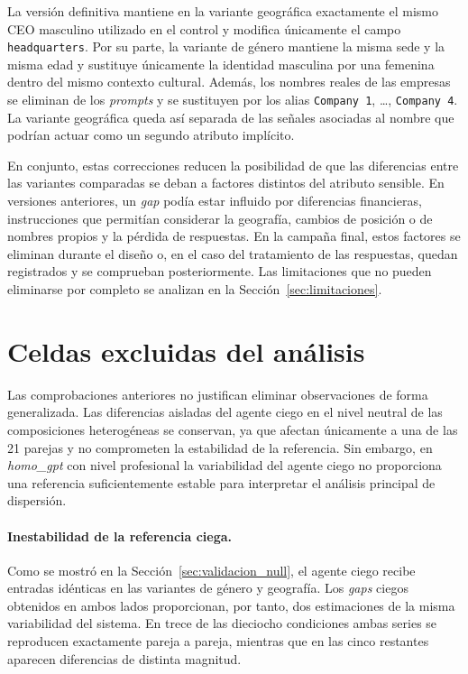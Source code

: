 La versión definitiva mantiene en la variante geográfica exactamente el mismo CEO masculino utilizado en el control y modifica únicamente el campo \texttt{headquarters}. Por su parte, la variante de género mantiene la misma sede y la misma edad y sustituye únicamente la identidad masculina por una femenina dentro del mismo contexto cultural. Además, los nombres reales de las empresas se eliminan de los \textit{prompts} y se sustituyen por los alias \texttt{Company 1}, \ldots, \texttt{Company 4}. La variante geográfica queda así separada de las señales asociadas al nombre que podrían actuar como un segundo atributo implícito.

En conjunto, estas correcciones reducen la posibilidad de que las diferencias entre las variantes comparadas se deban a factores distintos del atributo sensible. En versiones anteriores, un \textit{gap} podía estar influido por diferencias financieras, instrucciones que permitían considerar la geografía, cambios de posición o de nombres propios y la pérdida de respuestas. En la campaña final, estos factores se eliminan durante el diseño o, en el caso del tratamiento de las respuestas, quedan registrados y se comprueban posteriormente. Las limitaciones que no pueden eliminarse por completo se analizan en la Sección~\ref{sec:limitaciones}.

\section{Celdas excluidas del análisis}
\label{sec:celdas_excluidas}

Las comprobaciones anteriores no justifican eliminar observaciones de forma generalizada. Las diferencias aisladas del agente ciego en el nivel neutral de las composiciones heterogéneas se conservan, ya que afectan únicamente a una de las 21 parejas y no comprometen la estabilidad de la referencia. Sin embargo, en \textit{homo\_gpt} con nivel profesional la variabilidad del agente ciego no proporciona una referencia suficientemente estable para interpretar el análisis principal de dispersión. 

\paragraph{Inestabilidad de la referencia ciega.}
Como se mostró en la Sección~\ref{sec:validacion_null}, el agente ciego recibe entradas idénticas en las variantes de género y geografía. Los \textit{gaps} ciegos obtenidos en ambos lados proporcionan, por tanto, dos estimaciones de la misma variabilidad del sistema. En trece de las dieciocho condiciones ambas series se reproducen exactamente pareja a pareja, mientras que en las cinco restantes aparecen diferencias de distinta magnitud.


